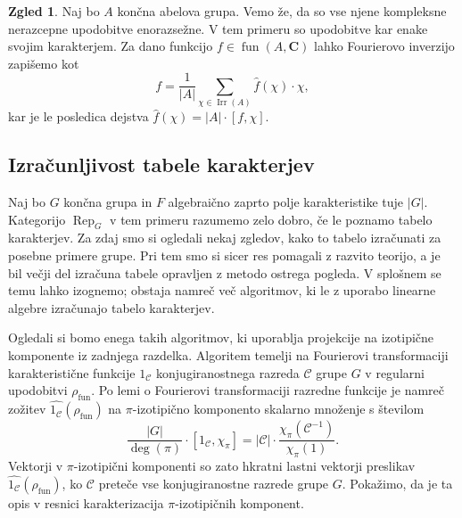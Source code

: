 \documentclass[11pt]{book}
\def\CC{\mathbf{C}}
\def\conclass{\mathcal{C}}
\DeclareMathOperator\Rep{Rep}
\DeclareMathOperator\Irr{Irr}
\DeclareMathOperator\fun{fun}
\theoremstyle{definition}
\theoremstyle{zgled}
\newtheorem{zgled}[theorem]{Zgled}
\theoremstyle{zgledbrezstevilke}
\theoremstyle{odprtproblem}
\theoremstyle{domacanaloga}
\theoremstyle{izrek}
\begin{document}
\begin{zgled}
Naj bo $A$ končna abelova grupa. Vemo že, da so vse njene kompleksne nerazcepne upodobitve enorazsežne. V tem primeru so upodobitve kar enake svojim karakterjem. Za dano funkcijo $f \in \fun(A,\CC)$ lahko Fourierovo inverzijo zapišemo kot
\[
    f = \frac{1}{|A|} \sum_{\chi \in \Irr(A)} \hat{f}(\chi) \cdot \chi,
\]
kar je le posledica dejstva $\hat{f}(\chi) = |A| \cdot [ f, \chi ]$.
\end{zgled}

\subsection{Izračunljivost tabele karakterjev}

Naj bo $G$ končna grupa in $F$ algebraično zaprto polje karakteristike tuje $|G|$. Kategorijo $\Rep_G$ v tem primeru razumemo zelo dobro, če le poznamo tabelo karakterjev. Za zdaj smo si ogledali nekaj zgledov, kako to tabelo izračunati za posebne primere grupe. Pri tem smo si sicer res pomagali z razvito teorijo, a je bil večji del izračuna tabele opravljen z metodo ostrega pogleda. V splošnem se temu lahko izognemo; obstaja namreč več algoritmov, ki le z uporabo linearne algebre izračunajo tabelo karakterjev.

Ogledali si bomo enega takih algoritmov, ki uporablja projekcije na izotipične komponente iz zadnjega razdelka. Algoritem temelji na Fourierovi transformaciji karakteristične funkcije $1_{\conclass}$ konjugiranostnega razreda $\conclass$ grupe $G$ v regularni upodobitvi $\rho_{\fun}$. Po lemi o Fourierovi transformaciji razredne funkcije je namreč zožitev $\widehat{1_{\conclass}}(\rho_{\fun})$ na $\pi$-izotipično komponento skalarno množenje s številom
\[
    \frac{|G|}{\deg(\pi)} \cdot [1_{\conclass}, \chi_{\pi}] =
    |\conclass| \cdot \frac{\chi_{\pi}(\conclass^{-1})}{\chi_{\pi}(1)}.
\]
Vektorji v $\pi$-izotipični komponenti so zato hkratni lastni vektorji preslikav $\widehat{1_{\conclass}}(\rho_{\fun})$, ko $\conclass$ preteče vse konjugiranostne razrede grupe $G$. Pokažimo, da je ta opis v resnici karakterizacija $\pi$-izotipičnih komponent.
\end{document}
